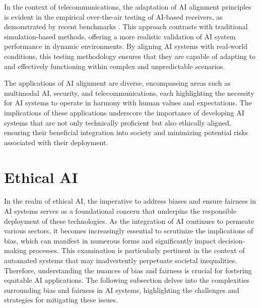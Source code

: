 In the context of telecommunications, the adaptation of AI alignment principles is evident in the empirical over-the-air testing of AI-based receivers, as demonstrated by recent benchmarks \cite{luostari2024adaptingrealityovertheairvalidation}. This approach contrasts with traditional simulation-based methods, offering a more realistic validation of AI system performance in dynamic environments. By aligning AI systems with real-world conditions, this testing methodology ensures that they are capable of adapting to and effectively functioning within complex and unpredictable scenarios.



The applications of AI alignment are diverse, encompassing areas such as multimodal AI, security, and telecommunications, each highlighting the necessity for AI systems to operate in harmony with human values and expectations. The implications of these applications underscore the importance of developing AI systems that are not only technically proficient but also ethically aligned, ensuring their beneficial integration into society and minimizing potential risks associated with their deployment.















\section{Ethical AI} \label{sec:Ethical AI}

In the realm of ethical AI, the imperative to address biases and ensure fairness in AI systems serves as a foundational concern that underpins the responsible deployment of these technologies. As the integration of AI continues to permeate various sectors, it becomes increasingly essential to scrutinize the implications of bias, which can manifest in numerous forms and significantly impact decision-making processes. This examination is particularly pertinent in the context of automated systems that may inadvertently perpetuate societal inequalities. Therefore, understanding the nuances of bias and fairness is crucial for fostering equitable AI applications. The following subsection delves into the complexities surrounding bias and fairness in AI systems, highlighting the challenges and strategies for mitigating these issues.





